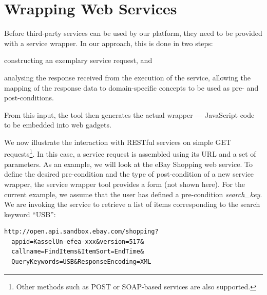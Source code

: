 
\section{Wrapping Web Services}
\label{sec:wrapping_web_services}

Before third-party services can be used by our platform, they need to be provided with a service wrapper. In our approach, this is done in two steps: 
\begin{inparaenum}[(i)]
	\item constructing an exemplary service request, and 
	\item analysing the response received from the execution of the service, allowing the mapping of the response data to domain-specific concepts to be used as pre- and post-conditions.
\end{inparaenum}
From this input, the tool then generates the actual wrapper --- JavaScript code to be embedded into web gadgets.


We now illustrate the interaction with RESTful services on simple GET requests\footnote{Other methods such as POST or SOAP-based services are also supported.}. 
In this case, a service request is assembled using its URL and a set of parameters. As an example, we will look at the eBay Shopping web service. 
To define the desired pre-condition and the type of post-condition of a new service wrapper, the service wrapper tool provides a form (not shown here). For the current example, we assume that the user has defined a pre-condition \emph{search\_key}.
We are invoking the service to retrieve a list of items corresponding to the search keyword ``USB'':

\begin{lstlisting}
http://open.api.sandbox.ebay.com/shopping?
  appid=KasselUn-efea-xxx&version=517&
  callname=FindItems&ItemSort=EndTime&
  QueryKeywords=USB&ResponseEncoding=XML
\end{lstlisting}


